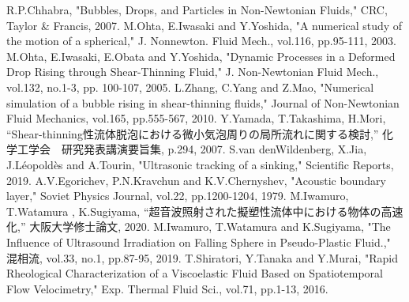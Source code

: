 \begin{thebibliography}{99}
     R.P.Chhabra, "Bubbles, Drops, and Particles in Non-Newtonian Fluids," CRC, Taylor \& Francis, 2007.
     M.Ohta, E.Iwasaki and Y.Yoshida, "A numerical study of the motion of a spherical," J. Nonnewton. Fluid Mech., vol.116, pp.95-111, 2003.
     M.Ohta, E.Iwasaki, E.Obata and Y.Yoshida, "Dynamic Processes in a Deformed Drop Rising through Shear-Thinning Fluid," J. Non-Newtonian Fluid Mech., vol.132, no.1-3, pp. 100-107, 2005.
     L.Zhang, C.Yang and Z.Mao, "Numerical simulation of a bubble rising in shear-thinning fluids," Journal of Non-Newtonian Fluid Mechanics, vol.165, pp.555-567, 2010.
     Y.Yamada, T.Takashima, H.Mori, “Shear-thinning性流体脱泡における微小気泡周りの局所流れに関する検討,” 化学工学会　研究発表講演要旨集, p.294, 2007.
     S.van denWildenberg, X.Jia, J.Léopoldès and A.Tourin, "Ultrasonic tracking of a sinking," Scientific Reports, 2019.
     A.V.Egorichev, P.N.Kravchun and K.V.Chernyshev, "Acoustic boundary layer," Soviet Physics Journal, vol.22, pp.1200-1204, 1979.
     M.Iwamuro, T.Watamura , K.Sugiyama, “超音波照射された擬塑性流体中における物体の高速化,” 大阪大学修士論文, 2020.
     M.Iwamuro, T.Watamura and K.Sugiyama, "The Influence of Ultrasound Irradiation on Falling Sphere in Pseudo-Plastic Fluid.," 混相流, vol.33, no.1, pp.87-95, 2019.
     T.Shiratori, Y.Tanaka and Y.Murai, "Rapid Rheological Characterization of a Viscoelastic Fluid Based on Spatiotemporal Flow Velocimetry," Exp. Thermal Fluid Sci., vol.71, pp.1-13, 2016.
\end{thebibliography}